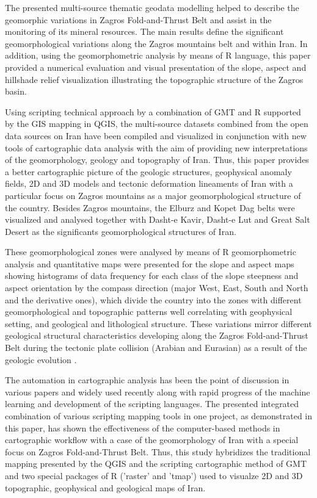\documentclass[12pt,a4paper,oneside]{article}
\def \newpar{\vspace{6pt}}
\begin{document}
\newpar The presented multi-source thematic geodata modelling helped to describe the geomorphic variations in Zagros Fold-and-Thrust Belt and assist in the monitoring of its mineral resources. The main results define the significant geomorphological variations along the Zagros mountains belt and within Iran. In addition, using the geomorphometric analysis by means of R language, this paper provided a numerical evaluation and visual presentation of the slope, aspect and hillshade relief visualization illustrating the topographic structure of the Zagros basin.

\newpar Using scripting technical approach by a combination of GMT and R supported by the GIS mapping in QGIS, the multi-source datasets combined from the open data sources on Iran have been compiled and visualized in conjunction with new tools of cartographic data analysis with the aim of providing new interpretations of the geomorphology, geology and topography of Iran. Thus, this paper provides a better cartographic picture of the geologic structures, geophysical anomaly fields, 2D and 3D models and tectonic deformation lineaments of Iran with a particular focus on Zagros mountains as a major geomorphological structure of the country. Besides Zagros mountains, the Elburz and Kopet Dag belts were visualized and analysed together with Dasht-e Kavir, Dasht-e Lut and Great Salt Desert as the significants geomorphological structures of Iran. 

\newpar These geomorphological zones were analysed by means of R geomorphometric analysis and quantitative maps were presented for the slope and aspect maps showing histograms of data frequency for each class of the slope steepness and aspect orientation by the compass direction (major West, East, South and North and the derivative ones), which divide the country into the zones with different geomorphological and topographic patterns well correlating with geophysical setting, and geological and lithological structure. These variations mirror different geological structural characteristics developing along the Zagros Fold-and-Thrust Belt during the tectonic plate collision (Arabian and Eurasian) as a result of the geologic evolution \citep{SCHOENBOHM2022120}. 

\newpar The automation in cartographic analysis has been the point of discussion in various papers \citep{4779020,Lemenkova202205,384853,Lemenkova2019c,Lemenkova202213,1526600,Lemenkova202206,529693} and widely used recently along with rapid progress of the machine learning and development of the scripting languages. The presented integrated combination of various scripting mapping tools in one project, as demonstrated in this paper, has shown the effectiveness of the computer-based methods in cartographic workflow with a case of the geomorphology of Iran with a special focus on Zagros Fold-and-Thrust Belt. Thus, this study hybridizes the traditional mapping presented by the QGIS and the scripting cartographic method of GMT and two special packages of R ('raster' and 'tmap') used to visualze 2D and 3D topographic, geophysical and geological maps of Iran. 
\end{document}
